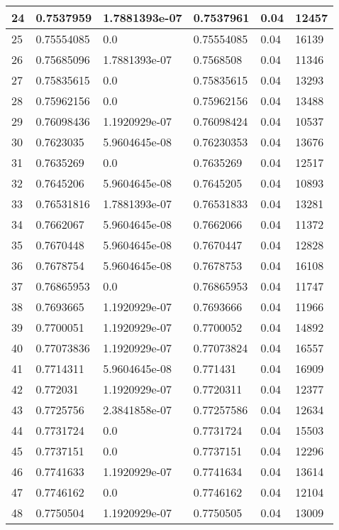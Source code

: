 \begin{longtable}{|l|l|l|l|l|l|}
24 & 0.7537959 & 1.7881393e-07 & 0.7537961 & 0.04 & 12457 \\ \hline 
25 & 0.75554085 & 0.0 & 0.75554085 & 0.04 & 16139 \\ \hline 
26 & 0.75685096 & 1.7881393e-07 & 0.7568508 & 0.04 & 11346 \\ \hline 
27 & 0.75835615 & 0.0 & 0.75835615 & 0.04 & 13293 \\ \hline 
28 & 0.75962156 & 0.0 & 0.75962156 & 0.04 & 13488 \\ \hline 
29 & 0.76098436 & 1.1920929e-07 & 0.76098424 & 0.04 & 10537 \\ \hline 
30 & 0.7623035 & 5.9604645e-08 & 0.76230353 & 0.04 & 13676 \\ \hline 
31 & 0.7635269 & 0.0 & 0.7635269 & 0.04 & 12517 \\ \hline 
32 & 0.7645206 & 5.9604645e-08 & 0.7645205 & 0.04 & 10893 \\ \hline 
33 & 0.76531816 & 1.7881393e-07 & 0.76531833 & 0.04 & 13281 \\ \hline 
34 & 0.7662067 & 5.9604645e-08 & 0.7662066 & 0.04 & 11372 \\ \hline 
35 & 0.7670448 & 5.9604645e-08 & 0.7670447 & 0.04 & 12828 \\ \hline 
36 & 0.7678754 & 5.9604645e-08 & 0.7678753 & 0.04 & 16108 \\ \hline 
37 & 0.76865953 & 0.0 & 0.76865953 & 0.04 & 11747 \\ \hline 
38 & 0.7693665 & 1.1920929e-07 & 0.7693666 & 0.04 & 11966 \\ \hline 
39 & 0.7700051 & 1.1920929e-07 & 0.7700052 & 0.04 & 14892 \\ \hline 
40 & 0.77073836 & 1.1920929e-07 & 0.77073824 & 0.04 & 16557 \\ \hline 
41 & 0.7714311 & 5.9604645e-08 & 0.771431 & 0.04 & 16909 \\ \hline 
42 & 0.772031 & 1.1920929e-07 & 0.7720311 & 0.04 & 12377 \\ \hline 
43 & 0.7725756 & 2.3841858e-07 & 0.77257586 & 0.04 & 12634 \\ \hline 
44 & 0.7731724 & 0.0 & 0.7731724 & 0.04 & 15503 \\ \hline 
45 & 0.7737151 & 0.0 & 0.7737151 & 0.04 & 12296 \\ \hline 
46 & 0.7741633 & 1.1920929e-07 & 0.7741634 & 0.04 & 13614 \\ \hline 
47 & 0.7746162 & 0.0 & 0.7746162 & 0.04 & 12104 \\ \hline 
48 & 0.7750504 & 1.1920929e-07 & 0.7750505 & 0.04 & 13009 \\ \hline 

\end{longtable}
